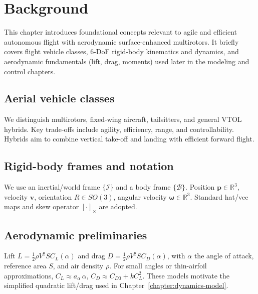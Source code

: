 
\chapter{Background}\label{chapter:background}

This chapter introduces foundational concepts relevant to agile and efficient autonomous 
flight with aerodynamic surface-enhanced multirotors. It briefly covers flight vehicle classes, 6-DoF rigid-body kinematics and dynamics, and aerodynamic fundamentals (lift, drag, moments) used later in the modeling and control chapters.

\section{Aerial vehicle classes}
We distinguish multirotors, fixed-wing aircraft, tailsitters, and general VTOL hybrids. 
Key trade-offs include agility, efficiency, range, and controllability. 
Hybrids aim to combine vertical take-off and landing with efficient forward flight.

\section{Rigid-body frames and notation}
We use an inertial/world frame $\{\mathcal{I}\}$ and a body frame $\{\mathcal{B}\}$. Position $\mathbf{p}\in\mathbb{R}^3$, velocity $\mathbf{v}$, orientation $R\in SO(3)$, angular velocity $\boldsymbol{\omega}\in\mathbb{R}^3$. Standard hat/vee maps and skew operator $[\cdot]_\times$ are adopted.

\section{Aerodynamic preliminaries}
Lift $L=\tfrac{1}{2}\rho V^2 S C_L(\alpha)$ and drag $D=\tfrac{1}{2}\rho V^2 S C_D(\alpha)$, with $\alpha$ the angle of attack, reference area $S$, and air density $\rho$. For small angles or thin-airfoil approximations, $C_L\approx a_\alpha\,\alpha$, $C_D\approx C_{D0}+kC_L^2$. These models motivate the simplified quadratic lift/drag used in Chapter~\ref{chapter:dynamics-model}.
